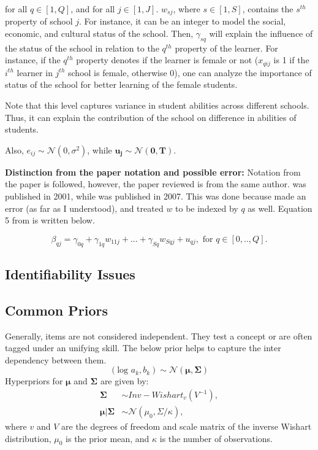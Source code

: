 \documentclass[12pt]{article}
\begin{document}
for all $q \in [1, Q]$, and for all $ j \in [1, J]$. $w_{sj}$, where $s \in [1, S]$, contains the $s^{th}$ property of school $j$. For instance, it can be an integer to model the social, economic, and cultural status of the school. Then, $\gamma_{sq}$ will explain the influence of the status of the school in relation to the $q^{th}$ property of the learner. For instance, if the $q^{th}$ property denotes if the learner is female or not ($x_{qij}$ is 1 if the $i^{th}$ learner in $j^{th}$ school is female, otherwise 0), one can analyze the importance of status of the school for better learning of the female students.

Note that this level captures variance in student abilities across different schools. Thus, it can explain the contribution of the school on difference in abilities of students.

Also, $e_{ij} \sim \mathcal{N}(0, \sigma^2)$, while $\boldsymbol{u_j} \sim \mathcal{N}(\boldsymbol{0}, \boldsymbol{T})$.

\textbf{Distinction from the paper notation and possible error:}
Notation from the paper \cite{fox2007multilevel} is followed, however, the paper reviewed is \cite{fox2001bayesian} from the same author. \cite{fox2001bayesian} was published in 2001, while \cite{fox2007multilevel} was published in 2007. This was done because \cite{fox2001bayesian} made an error (as far as I understood), and treated $w$ to be indexed by $q$ as well. Equation 5 from \cite{fox2001bayesian} is written below.

\begin{equation*}
    \beta_{qj} = \gamma_{0q} + \gamma_{1q}w_{11j} + ... + \gamma_{Sq}w_{Sqj} + u_{qj}, \text{ for } q\in [0,.., Q].
\end{equation*}

\subsection{Identifiability Issues}

\subsection{Common Priors}
Generally, items are not considered independent. They test a concept or are often tagged under an unifying skill. The below prior helps to capture the inter dependency between them.
\begin{equation*}
    (\text{log }a_k, b_k) \sim \mathcal{N}(\boldsymbol{\mu}, \boldsymbol{\Sigma})
\end{equation*}
Hyperpriors for $\boldsymbol{\mu}$ and $\boldsymbol{\Sigma}$ are given by:
\begin{align*}
    \boldsymbol{\Sigma} & \sim Inv-Wishart_v(V^{-1}),\\
    \boldsymbol{\mu}|\boldsymbol{\Sigma} & \sim \mathcal{N}(\mu_0, \Sigma/\kappa),
\end{align*}
where $v$ and $V$ are the degrees of freedom and scale matrix of the inverse Wishart distribution, $\mu_0$ is the prior mean, and $\kappa$ is the number of observations.
\end{document}
